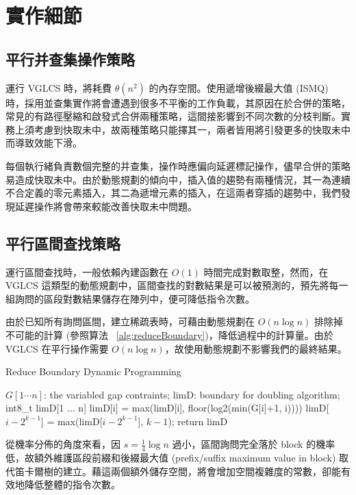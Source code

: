\documentclass{gapd}
\begin{document}
\section{實作細節}
\label{sec:Implementation}

\subsection{平行并查集操作策略}

運行 VGLCS 時，將耗費 $\theta(n^2)$ 的內存空間。使用遞增後綴最大值 (ISMQ) 時，採用並查集實作將會遭遇到很多不平衡的工作負載，其原因在於合併的策略，常見的有路徑壓縮和啟發式合併兩種策略，這間接影響到不同次數的分枝判斷。實務上須考慮到快取未中，故兩種策略只能擇其一，兩者皆用將引發更多的快取未中而導致效能下滑。

每個執行緒負責數個完整的并查集，操作時應偏向延遲標記操作，儘早合併的策略易造成快取未中。由於動態規劃的傾向中，插入值的趨勢有兩種情況，其一為連續不合定義的零元素插入，其二為遞增元素的插入，在這兩者穿插的趨勢中，我們發現延遲操作將會帶來較能改善快取未中問題。

\subsection{平行區間查找策略}

運行區間查找時，一般依賴內建函數在 $O(1)$ 時間完成對數取整，然而，在 VGLCS 這類型的動態規劃中，區間查找的對數結果是可以被預測的，預先將每一組詢問的區段對數結果儲存在陣列中，便可降低指令次數。

由於已知所有詢問區間，建立稀疏表時，可藉由動態規劃在 $O(n \log n)$ 排除掉不可能的計算 (參照算法 ~\ref{alg:reduceBoundary})，降低過程中的計算量。由於 VGLCS 在平行操作需要 $O(n \log n)$，故使用動態規劃不影響我們的最終結果。

\begin{algorithm*}
  \caption{Reduce Boundary Dynamic Programming}
  \label{alg:reduceBoundary}
  \begin{algorithmic}[1]
  \Require
      $G[1 \cdots n]$: the variabled gap contraints;
  \Ensure
      $\text{limD}$: boundary for doubling algorithm;
  \State int8\_t limD[1 ... n]
    \State limD[i] = max(limD[i], floor(log2(min(G[i]+1, i))))
      \State limD[$i-2^{k-1}$] = max(limD[$i-2^{k-1}$], $k-1$);
    \EndFor
  \EndFor
  \State return limD
  \end{algorithmic}
\end{algorithm*}

從機率分佈的角度來看，因 $s = \frac{1}{4} \log n$ 過小，區間詢問完全落於 block 的機率低，故額外維護區段前綴和後綴最大值 (prefix/suffix maximum value in block) 取代笛卡爾樹的建立。藉這兩個額外儲存空間，將會增加空間複雜度的常數，卻能有效地降低整體的指令次數。
\end{document}

